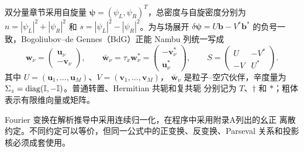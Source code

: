双分量章节采用自旋量
$\bm\psi=(\psi_L,\psi_R)^T$，总密度与自旋密度分别为
$n=|\psi_L|^2+|\psi_R|^2$ 和
$s=|\psi_L|^2-|\psi_R|^2$。为与场展开
$\delta\bm\psi=U\bm b-V^*\bm b^*$ 的负号一致，Bogoliubov--de Gennes（BdG）正能 Nambu 列统一写成
\begin{equation*}
  \bm w_\nu=\begin{pmatrix}\bm u_\nu\\-\bm v_\nu\end{pmatrix},
  \qquad
  \bar{\bm w}_\nu=\tau_x\bm w_\nu^*
  =\begin{pmatrix}-\bm v_\nu^*\\\bm u_\nu^*\end{pmatrix},
  \qquad
  S=\begin{pmatrix}U&-V^*\\-V&U^*\end{pmatrix}.
\end{equation*}
其中 $U=(\bm u_1,\ldots,\bm u_M)$、$V=(\bm v_1,\ldots,\bm v_M)$，
$\bar{\bm w}_\nu$ 是粒子--空穴伙伴，辛度量为
$\Sigma_z=\operatorname{diag}(\mathbb{I},-\mathbb{I})$。普通转置、Hermitian 共轭和复共轭
分别记为 $T$、$\dagger$ 和 $*$；粗体表示有限维向量或矩阵。

Fourier 变换在解析推导中采用连续归一化，在程序中采用附录A列出的幺正
离散约定。不同约定可以等价，但同一公式中的正变换、反变换、Parseval
关系和投影核必须成套使用。
